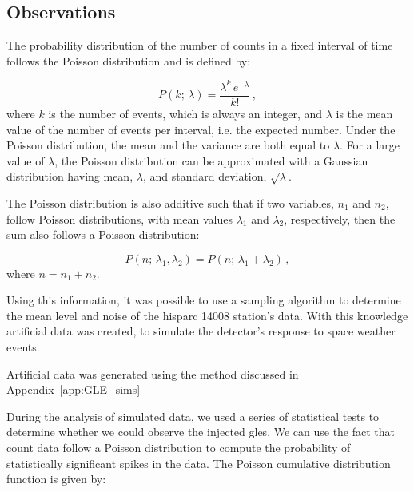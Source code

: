 \subsection{Observations}\label{sec:HS_14008_method_obs}

The probability distribution of the number of counts in a fixed interval of time follows the Poisson distribution and is defined by:

\begin{equation}
P(k; \, \lambda) = \frac{\lambda^k \, e^{-\lambda}}{k!} \, ,
\label{eq:poisson_PDF}
\end{equation}
%
where $k$ is the number of events, which is always an integer, and $\lambda$ is the mean value of the number of events per interval, i.e. the expected number. Under the Poisson distribution, the mean and the variance are both equal to $\lambda$. For a large value of $\lambda$, the Poisson distribution can be approximated with a Gaussian distribution having mean, $\lambda$, and standard deviation, $\sqrt{\lambda}$.

The Poisson distribution is also additive such that if two variables, $n_1$ and $n_2$, follow Poisson distributions, with mean values $\lambda_1$ and $\lambda_2$, respectively, then the sum also follows a Poisson distribution:

\begin{equation}
P(n; \, \lambda_1, \lambda_2) = P(n; \, \lambda_1 + \lambda_2) \, ,
\label{eq:poisson_additive_PDF}
\end{equation}
%
where $n = n_1 + n_2$.

Using this information, it was possible to use a sampling algorithm to determine the mean level and noise of the \gls{hisparc} 14008 station's data. With this knowledge artificial data was created, to simulate the detector's response to space weather events. 

Artificial data was generated using the method discussed in Appendix~\ref{app:GLE_sims}

During the analysis of simulated data, we used a series of statistical tests to determine whether we could observe the injected \glspl{gle}. We can use the fact that count data follow a Poisson distribution to compute the probability of statistically significant spikes in the data. The Poisson cumulative distribution function is given by:

